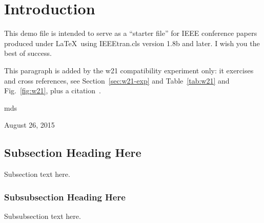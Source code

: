 \documentclass[conference]{IEEEtran}
\begin{document}




\maketitle

\begin{abstract}
The abstract goes here.
\end{abstract}





%
\IEEEpeerreviewmaketitle



\section{Introduction}
This demo file is intended to serve as a ``starter file''
for IEEE conference papers produced under \LaTeX\ using
IEEEtran.cls version 1.8b and later.
I wish you the best of success.

This paragraph is added by the w21 compatibility experiment only:
it exercises \cite{} and cross references, see
Section~\ref{sec:w21-exp} and Table~\ref{tab:w21} and
Fig.~\ref{fig:w21}, plus a citation~\cite{IEEEhowto:kopka}.

\hfill mds
 
\hfill August 26, 2015

\subsection{Subsection Heading Here}
Subsection text here.


\subsubsection{Subsubsection Heading Here}
Subsubsection text here.
\end{document}
